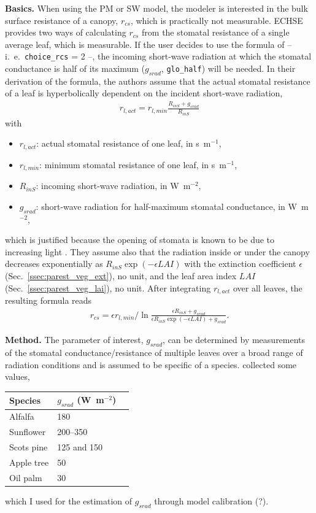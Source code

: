 \documentclass{scrreprt}
\newenvironment{denseitem}{
  \begin{itemize}
    \setlength{\itemsep}{0pt}
    \setlength{\parskip}{0pt}
    \setlength{\parsep}{0pt}
}{
  \end{itemize}
}
\begin{document}
\textbf{Basics.}
When using the PM or SW model, the modeler is interested in the bulk surface resistance of a canopy, $r_{cs}$, which is practically not measurable.
ECHSE provides two ways of calculating $r_{cs}$ from the stomatal resistance of a single average leaf, which is measurable.
If the user decides to use the formula of \citet{saugier91} -- i.\ e.\ \verb!choice_rcs! = 2 --, the incoming short-wave radiation at which the stomatal conductance is half of its maximum ($g_{srad}$, \verb!glo_half!) will be needed.
In their derivation of the formula, the authors assume that the actual stomatal resistance of a leaf is hyperbolically dependent on the incident short-wave radiation,
\begin{align} \label{eq:glohalf1}
  r_{l,act} = r_{l,min} \frac{R_{inS} + g_{srad}}{R_{inS}}
\end{align}
%
with
\begin{denseitem}
  \item[] $r_{l,act}$: actual stomatal resistance of one leaf, in s~m$^{-1}$,
  \item[] $r_{l,min}$: minimum stomatal resistance of one leaf, in s~m$^{-1}$,
  \item[] $R_{inS}$: incoming short-wave radiation, in W~m$^{-2}$,
  \item[] $g_{srad}$: short-wave radiation for half-maximum stomatal conductance, in W~m$^{-2}$,
\end{denseitem}
%
which is justified because the opening of stomata is known to be due to increasing light \citep{sonnewald13}.
They assume also that the radiation inside or under the canopy decreases exponentially as $R_{inS} \exp(-\epsilon LAI)$ with the extinction coefficient $\epsilon$ (Sec.~\ref{ssec:parest_veg_ext}), no unit, and the leaf area index $LAI$ (Sec.~\ref{ssec:parest_veg_lai}), no unit.
After integrating $r_{l,act}$ over all leaves, the resulting formula reads
\begin{align} \label{eq:glohalf2}
  r_{cs} = \epsilon r_{l,min} / \ln \frac{\epsilon R_{inS} + g_{srad}}{\epsilon R_{inS} \exp(-\epsilon LAI) + g_{srad}}.
\end{align}

\noindent
\textbf{Method.}
The parameter of interest, $g_{srad}$, can be determined by measurements of the stomatal conductance/resistance of multiple leaves over a broad range of radiation conditions and is assumed to be specific of a species.
\citet{saugier91} collected some values,
%
\begin{table}[H]
  \centering
  \begin{tabular}{llr}
    Species    & $g_{srad}$ (W~m$^{-2}$) \\
    \hline
    Alfalfa    & 180 \\
    Sunflower  & 200--350 \\
    Scots pine & 125 and 150 \\
    Apple tree & 50 \\
    Oil palm   & 30
  \end{tabular}
  \label{tab:par_stressHum}
\end{table}
\noindent
which I used for the estimation of $g_{srad}$ through model calibration (?).
\end{document}
